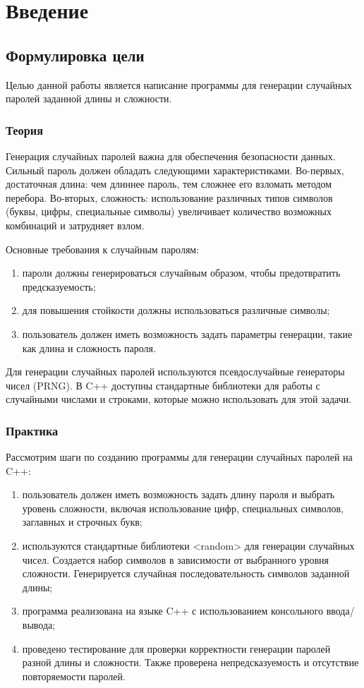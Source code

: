 \documentclass[12pt,a4paper]{scrartcl}
\begin{document}
\section{Введение}
\label{sec:intro}


\subsection{Формулировка цели}
Целью данной работы является написание программы для генерации случайных паролей заданной длины и сложности.

\subsubsection{Теория}
Генерация случайных паролей важна для обеспечения безопасности данных. Сильный пароль должен обладать следующими характеристиками. Во-первых, достаточная длина: чем длиннее пароль, тем сложнее его взломать методом перебора. Во-вторых, сложность: использование различных типов символов (буквы, цифры, специальные символы) увеличивает количество возможных комбинаций и затрудняет взлом.

Основные требования к случайным паролям:
    \begin{enumerate}
        \item пароли должны генерироваться случайным образом, чтобы предотвратить предсказуемость;
        \item для повышения стойкости должны использоваться различные символы;
        \item пользователь должен иметь возможность задать параметры генерации, такие как длина и сложность пароля.
    \end{enumerate}
    \noindent 

Для генерации случайных паролей используются псевдослучайные генераторы чисел (PRNG). В C++ доступны стандартные библиотеки для работы с случайными числами и строками, которые можно использовать для этой задачи.

\subsubsection{Практика}
Рассмотрим шаги по созданию программы для генерации случайных паролей на C++:
\begin{enumerate}
        \item пользователь должен иметь возможность задать длину пароля и выбрать уровень сложности, включая использование цифр, специальных символов, заглавных и строчных букв;
        \item используются стандартные библиотеки <random> для генерации случайных чисел. Создается набор символов в зависимости от выбранного уровня сложности. Генерируется случайная последовательность символов заданной длины;
        \item  программа реализована на языке C++ с использованием консольного ввода/вывода;
        \item проведено тестирование для проверки корректности генерации паролей разной длины и сложности. Также проверена непредсказуемость и отсутствие повторяемости паролей.
    \end{enumerate}
    \noindent 
\end{document}
